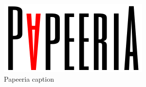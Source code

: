 \documentclass{article}
\begin{document}
\vspace*{\fill} \vspace*{-5ex}
\lipsum[1]
\begin{figure}[tbp]
    \begin{center}
        \includegraphics[scale=0.2]{papeeria}
    \end{center}
    \caption{Papeeria caption}
\end{figure}
\lipsum[1]
\vspace*{\fill}
\end{document}
